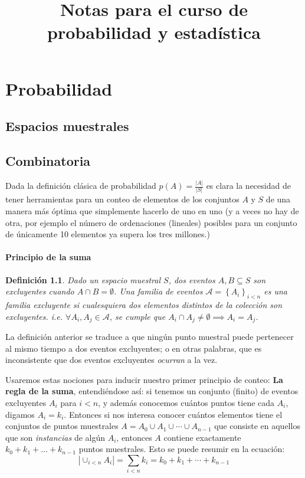 \documentclass[spanish]{report}
\title {Notas para el curso de probabilidad y estadística}
\newtheorem{defi}[thm]{Definición}
\newcommand{\card}[1]{\left|#1 \right|}
\begin{document}
\tableofcontents
\newpage
\chapter{Probabilidad}
\section{Espacios muestrales}

\section{Combinatoria}

Dada la definición clásica de probabilidad $p(A) = \frac{\card{A}}{\card{S}}$ es clara la necesidad de tener herramientas para un conteo de elementos de los conjuntos $A$ y $S$ de una manera más óptima que simplemente hacerlo de uno en uno (y a veces no hay de otra, por ejemplo el número de ordenaciones (lineales) posibles para un conjunto de únicamente 10 elementos ya supera los tres millones.)

\subsubsection{Principio de la suma}
\begin{defi}
	Dado un espacio muestral $S$, dos eventos $A, B \subseteq S$ son \emph{excluyentes} cuando $A \cap B = \emptyset$. 
	Una familia de eventos $\mathcal{A}= \left\lbrace A_i \right\rbrace_{i<n}$ es una \emph{familia excluyente} si cualesquiera dos elementos distintos de la colección son excluyentes. i.e. $\forall A_i, A_j \in \mathcal{A}$, se cumple que $A_i \cap A_j \neq \emptyset \implies A_i = A_j$.
\end{defi}

La definición anterior se traduce a que ningún punto muestral puede pertenecer al mismo tiempo a dos eventos excluyentes; o en otras palabras, que es inconsistente que dos eventos excluyentes \emph{ocurran} a la vez.

Usaremos estas nociones para inducir nuestro primer principio de conteo: \textbf{La regla de la suma}, entendiéndose así:
si tenemos un conjunto (finito) de eventos excluyentes $A_i$ para $i<n$, y además conocemos cuántos puntos tiene cada $A_i$, digamos $A_i = k_i$. Entonces si nos interesa conocer cuántos elementos tiene el conjuntos de puntos muestrales $A = A_0 \cup A_1 \cup \cdots \cup A_{n-1}$ que consiste en aquellos que son \emph{instancias} %
de algún $A_i$, entonces $A$ contiene exactamente $k_0 + k_1 + \ldots + k_{n-1}$ puntos muestrales.
Esto se puede resumir en la ecuación:
\begin{equation}\label{eq_PrincipioSuma}
	\card{\cup_{i<n} A_i} = \sum_{i<n} k_i = k_0 + k_1 + \cdots + k_{n-1}
\end{equation}
\end{document}
